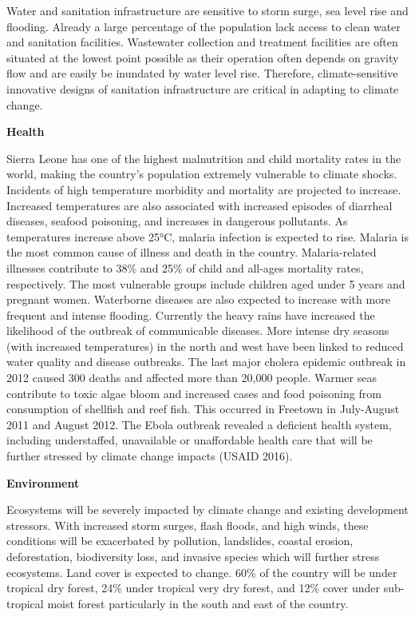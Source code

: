 \documentclass[
]{book}
\begin{document}
Water and sanitation infrastructure are sensitive to storm surge, sea level rise and flooding. Already a large percentage of the population lack access to clean water and sanitation facilities.
Wastewater collection and treatment facilities are often situated at the lowest point possible as their operation often depends on gravity flow and are easily be inundated by water level rise. Therefore, climate-sensitive innovative designs of sanitation infrastructure are critical in adapting to climate change.

\textbf{Health}

Sierra Leone has one of the highest malnutrition and child mortality rates in the world, making the country's population extremely vulnerable to climate shocks. Incidents of high temperature morbidity and mortality are projected to increase. Increased temperatures are also associated with increased episodes of diarrheal diseases, seafood poisoning, and increases in dangerous pollutants. As temperatures increase above 25°C, malaria infection is expected to rise. Malaria is the most common cause of illness and death in the country. Malaria-related illnesses contribute to 38\% and 25\% of child and all-ages mortality rates, respectively. The most vulnerable groups include children aged under 5 years and pregnant women.
Waterborne diseases are also expected to increase with more frequent and intense flooding. Currently the heavy rains have increased the likelihood of the outbreak of communicable diseases. More intense dry seasons (with increased temperatures) in the north and west have been linked to reduced water quality and disease outbreaks. The last major cholera epidemic outbreak in 2012 caused 300 deaths and affected more than 20,000 people. Warmer seas contribute to toxic algae bloom and increased cases and food poisoning from consumption of shellfish and reef fish. This occurred in Freetown in July-August 2011 and August 2012. The Ebola outbreak revealed a deficient health system, including understaffed, unavailable or unaffordable health care that will be further stressed by climate change impacts (USAID 2016).

\textbf{Environment}

Ecosystems will be severely impacted by climate change and existing development stressors. With increased storm surges, flash floods, and high winds, these conditions will be exacerbated by pollution, landslides, coastal erosion, deforestation, biodiversity loss, and invasive species which will further stress ecosystems. Land cover is expected to change. 60\% of the country will be under tropical dry forest, 24\% under tropical very dry forest, and 12\% cover under sub-tropical moist forest particularly in the south and east of the country.
\end{document}
